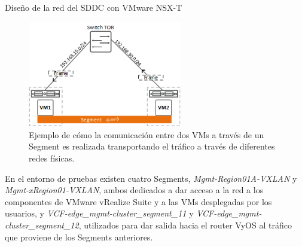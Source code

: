 \begin{subsubsection}{Diseño de la red del SDDC con VMware NSX-T}
    \begin{figure}[h]
        \centering
        \includegraphics[width=0.6\textwidth]{imaxes/pruebaconcepto/frame-nsx-t.png}
        \caption{Ejemplo de cómo la comunicación entre dos VMs a través de un Segment es realizada transportando el tráfico a través de diferentes redes físicas.}
        \label{fig:frame-nsx-t}
      \end{figure}
    \FloatBarrier
    En el entorno de pruebas existen cuatro Segments, \textit{Mgmt-Region01A-VXLAN} y \textit{Mgmt-xRegion01-VXLAN}, ambos dedicados a dar acceso a la red a los componentes de VMware vRealize Suite y a las VMs desplegadas por los usuarios, y \textit{VCF-edge\_mgmt-cluster\_segment\_11} y \textit{VCF-edge\_mgmt-cluster\_segment\_12}, utilizados para dar salida hacia el router VyOS al tráfico que proviene de los Segments anteriores.


\end{subsubsection}

